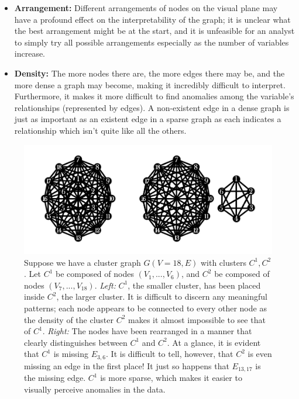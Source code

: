 \tablespacing
\begin{itemize}
	\item \textbf{Arrangement:} Different arrangements of nodes on the visual 
	plane may have a profound effect on the interpretability of the graph; it 
	is unclear what the best arrangement might be at the start, and it is 
	unfeasible for an analyst to simply try all possible arrangements 
	especially as the number of variables increase.
	
	\item \textbf{Density:} The more nodes there are, the more edges there may 
	be, and the more dense a graph may become, making it incredibly difficult 
	to interpret. Furthermore, it makes it more difficult to find anomalies 
	among the variable's relationships (represented by edges). A non-existent 
	edge in a dense graph is just as important as an existent edge in a sparse 
	graph as each indicates a relationship which isn't quite like all the 
	others.
\end{itemize}
\bodyspacing

\begin{figure}[htb]
	\begin{center}
		\includegraphics[width=1\linewidth]{ch-gc/figures/arr_density}
		\caption[Difficulties with graph visualization.]{
		Suppose we have a cluster graph $G(V = 18,E)$ with clusters $C^1,C^2$. 
		Let $C^1$ be composed of nodes $(V_1,...,V_6)$, and $C^2$ be composed 
		of nodes $(V_7,...,V_{18})$. 
		\textit{Left:} $C^1$, the smaller cluster, has been placed inside 
		$C^2$, the larger cluster. It is difficult to discern any meaningful 
		patterns; each node appears to be connected to every other node as the 
		density of the cluster $C^2$ makes it almost impossible to see that of 
		$C^1$.
		\textit{Right:} The nodes have been rearranged in a manner that clearly 
		distinguishes between $C^1$ and $C^2$. At a glance, it is evident that 
		$C^1$ is missing $E_{3,6}$. It is difficult to tell, however, that 
		$C^2$ is even missing an edge in the first place! It just so happens 
		that $E_{13,17}$ is the missing edge.
		$C^1$ is more sparse, which makes it easier to visually perceive 
		anomalies in the data.}
		\label{fig:gc:arr_density}
	\end{center}
\end{figure}

